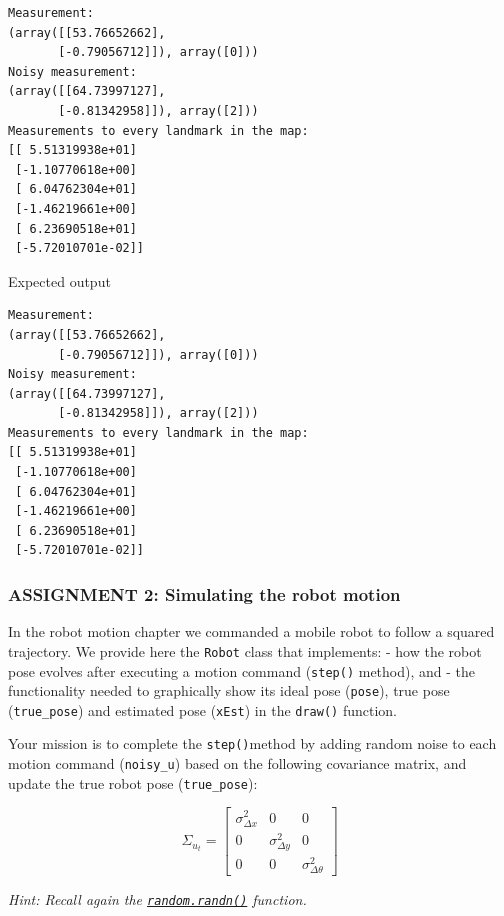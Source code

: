 \documentclass[11pt]{article}
\begin{document}
    \begin{Verbatim}[commandchars=\\\{\}]
Measurement:
(array([[53.76652662],
       [-0.79056712]]), array([0]))
Noisy measurement:
(array([[64.73997127],
       [-0.81342958]]), array([2]))
Measurements to every landmark in the map:
[[ 5.51319938e+01]
 [-1.10770618e+00]
 [ 6.04762304e+01]
 [-1.46219661e+00]
 [ 6.23690518e+01]
 [-5.72010701e-02]]
    \end{Verbatim}

    {Expected output}

\begin{verbatim}
Measurement:
(array([[53.76652662],
       [-0.79056712]]), array([0]))
Noisy measurement:
(array([[64.73997127],
       [-0.81342958]]), array([2]))
Measurements to every landmark in the map:
[[ 5.51319938e+01]
 [-1.10770618e+00]
 [ 6.04762304e+01]
 [-1.46219661e+00]
 [ 6.23690518e+01]
 [-5.72010701e-02]]
\end{verbatim}

    \hypertarget{assignment-2-simulating-the-robot-motion}{%
\subsubsection{\texorpdfstring{\textbf{{ASSIGNMENT 2: Simulating the
robot
motion}}}{ASSIGNMENT 2: Simulating the robot motion}}\label{assignment-2-simulating-the-robot-motion}}

In the robot motion chapter we commanded a mobile robot to follow a
squared trajectory. We provide here the \texttt{Robot} class that
implements: - how the robot pose evolves after executing a motion
command (\texttt{step()} method), and - the functionality needed to
graphically show its ideal pose (\texttt{pose}), true pose
(\texttt{true\_pose}) and estimated pose (\texttt{xEst}) in the
\texttt{draw()} function.

Your mission is to complete the \texttt{step()}method by adding random
noise to each motion command (\texttt{noisy\_u}) based on the following
covariance matrix, and update the true robot pose (\texttt{true\_pose}):

\[\Sigma_{u_t} = 
    \begin{bmatrix}
        \sigma^2_{\Delta x} & 0 & 0\\
        0 & \sigma^2_{\Delta y} & 0\\
        0 & 0 & \sigma^2_{\Delta \theta}
    \end{bmatrix}
\]

\emph{Hint: Recall again the
\href{https://docs.scipy.org/doc/numpy-1.15.1/reference/generated/numpy.random.randn.html}{\texttt{random.randn()}}
function.}
\end{document}
